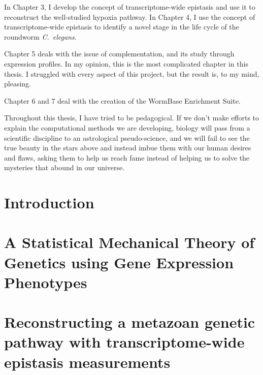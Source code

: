\documentclass[12pt]{caltech_thesis}
\newcommand{\cel}{\emph{C.~elegans}}
\begin{document}
In Chapter 3, I develop the concept of transcriptome-wide epistasis and use
it to reconstruct the well-studied hypoxia pathway. In Chapter 4, I use the
concept of transcriptome-wide epistasis to identify a novel stage in the life
cycle of the roundworm \cel{}.

Chapter 5 deals with the issue of complementation, and its study through
expression profiles. In my opinion, this is the most complicated chapter in this
thesis. I struggled with every aspect of this project, but the result is, to my
mind, pleasing.

Chapter 6 and 7 deal with the creation of the WormBase Enrichment Suite.

Throughout this thesis, I have tried to be pedagogical. If we don't make efforts
to explain the computational methods we are developing, biology will pass from
a scientific discipline to an astrological pseudo-science, and we will fail to
see the true beauty in the stars above and instead imbue them with our human
desires and flaws, asking them to help us reach fame instead of helping us to
solve the mysteries that abound in our universe.


\chapter{Introduction}
\begin{refsection}
  
  \printbibliography[heading=subbibliography]
\end{refsection}

\chapter{A Statistical Mechanical Theory of Genetics using Gene Expression
         Phenotypes}
\begin{refsection}
  
  \printbibliography[heading=subbibliography]
\end{refsection}

\chapter{Reconstructing a metazoan genetic pathway with transcriptome-wide
         epistasis measurements}
\begin{refsection}
  
  \printbibliography[heading=subbibliography]
\end{refsection}
\end{document}
